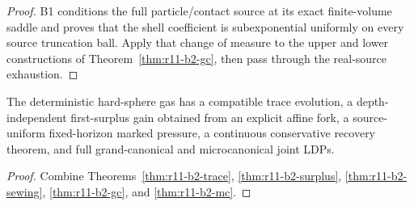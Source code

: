 \begin{proof}
B1 conditions the full particle/contact source at its exact finite-volume
saddle and proves that the shell coefficient is subexponential uniformly on
every source truncation ball.  Apply that change of measure to the upper and
lower constructions of Theorem~\ref{thm:r11-b2-gc}, then pass through the
real-source exhaustion.
\end{proof}

\begin{theorem}
\label{thm:r11-b2-main}
The deterministic hard-sphere gas has a compatible trace evolution, a
depth-independent first-surplus gain obtained from an explicit affine fork,
a source-uniform fixed-horizon marked pressure, a continuous conservative
recovery theorem, and full grand-canonical and microcanonical joint LDPs.
\end{theorem}

\begin{proof}
Combine Theorems~\ref{thm:r11-b2-trace},
\ref{thm:r11-b2-surplus}, \ref{thm:r11-b2-sewing},
\ref{thm:r11-b2-gc}, and \ref{thm:r11-b2-mc}.
\end{proof}
